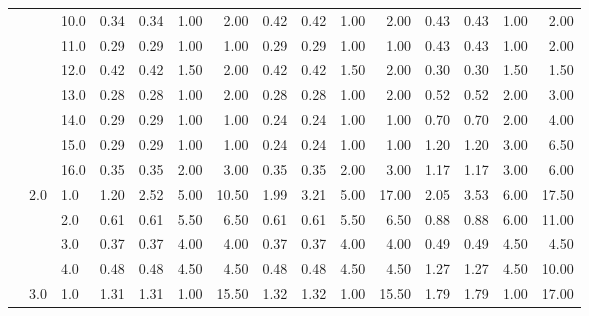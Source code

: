 \begin{tabular}{lllrrrrrrrrrrrr}
     &     & 10.0 &       0.34 &      0.34 & 1.00 &   2.00 &       0.42 &      0.42 & 1.00 &   2.00 &       0.43 &      0.43 & 1.00 &   2.00 \\
     &     & 11.0 &       0.29 &      0.29 & 1.00 &   1.00 &       0.29 &      0.29 & 1.00 &   1.00 &       0.43 &      0.43 & 1.00 &   2.00 \\
     &     & 12.0 &       0.42 &      0.42 & 1.50 &   2.00 &       0.42 &      0.42 & 1.50 &   2.00 &       0.30 &      0.30 & 1.50 &   1.50 \\
     &     & 13.0 &       0.28 &      0.28 & 1.00 &   2.00 &       0.28 &      0.28 & 1.00 &   2.00 &       0.52 &      0.52 & 2.00 &   3.00 \\
     &     & 14.0 &       0.29 &      0.29 & 1.00 &   1.00 &       0.24 &      0.24 & 1.00 &   1.00 &       0.70 &      0.70 & 2.00 &   4.00 \\
     &     & 15.0 &       0.29 &      0.29 & 1.00 &   1.00 &       0.24 &      0.24 & 1.00 &   1.00 &       1.20 &      1.20 & 3.00 &   6.50 \\
     &     & 16.0 &       0.35 &      0.35 & 2.00 &   3.00 &       0.35 &      0.35 & 2.00 &   3.00 &       1.17 &      1.17 & 3.00 &   6.00 \\
     & 2.0 & 1.0  &       1.20 &      2.52 & 5.00 &  10.50 &       1.99 &      3.21 & 5.00 &  17.00 &       2.05 &      3.53 & 6.00 &  17.50 \\
     &     & 2.0  &       0.61 &      0.61 & 5.50 &   6.50 &       0.61 &      0.61 & 5.50 &   6.50 &       0.88 &      0.88 & 6.00 &  11.00 \\
     &     & 3.0  &       0.37 &      0.37 & 4.00 &   4.00 &       0.37 &      0.37 & 4.00 &   4.00 &       0.49 &      0.49 & 4.50 &   4.50 \\
     &     & 4.0  &       0.48 &      0.48 & 4.50 &   4.50 &       0.48 &      0.48 & 4.50 &   4.50 &       1.27 &      1.27 & 4.50 &  10.00 \\
     & 3.0 & 1.0  &       1.31 &      1.31 & 1.00 &  15.50 &       1.32 &      1.32 & 1.00 &  15.50 &       1.79 &      1.79 & 1.00 &  17.00 \\
\bottomrule
\end{tabular}
